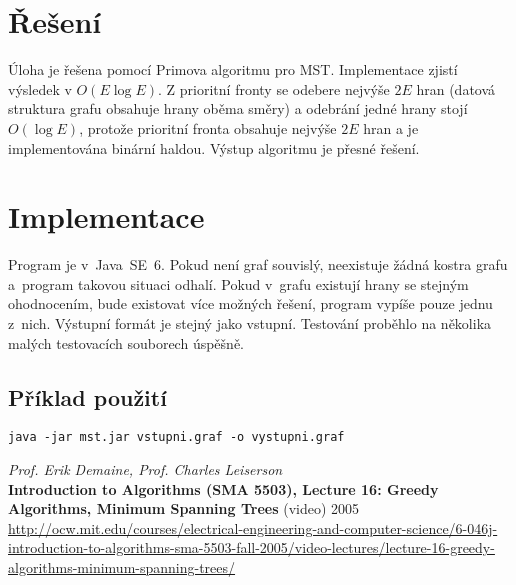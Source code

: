 \documentclass[11pt]{article}
\begin{document}
\clearpage
\section{Řešení}
Úloha je řešena pomocí Primova algoritmu pro MST. Implementace zjistí výsledek
v $O(E \log E)$. Z prioritní fronty se odebere nejvýše $2E$ hran (datová
struktura grafu obsahuje hrany oběma směry) a odebrání jedné hrany stojí
$O(\log E)$, protože prioritní fronta obsahuje nejvýše $2E$ hran a je
implementována binární haldou. Výstup algoritmu je přesné řešení.

\section{Implementace}
Program je v~Java~SE~6. Pokud není graf souvislý, neexistuje žádná kostra grafu
a~program takovou situaci odhalí. Pokud v~grafu existují hrany se stejným
ohodnocením, bude existovat více možných řešení, program vypíše pouze jednu
z~nich. Výstupní formát je stejný jako vstupní. Testování proběhlo na několika
malých testovacích souborech úspěšně.

\subsection{Příklad použití}
\begin{verbatim}
java -jar mst.jar vstupni.graf -o vystupni.graf
\end{verbatim}

\begin{thebibliography}{1}

{\em Prof. Erik Demaine, Prof. Charles Leiserson} \\
{\bf Introduction to Algorithms (SMA 5503), 
    Lecture 16: Greedy Algorithms, Minimum Spanning Trees} (video) 2005 \\
\url{http://ocw.mit.edu/courses/electrical-engineering-and-computer-science/6-046j-introduction-to-algorithms-sma-5503-fall-2005/video-lectures/lecture-16-greedy-algorithms-minimum-spanning-trees/}

\end{thebibliography}
\end{document}
